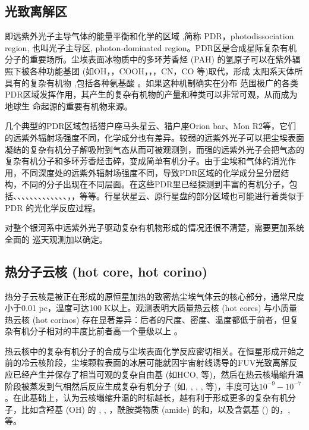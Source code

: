 \documentclass{report}
\begin{document}
\subsection{光致离解区} 即远紫外光子主导气体的能量平衡和化学的区域 \citep{Tielens2005} ,简称 PDR，photodissociation region, 也叫光子主导区, photon-dominated region。PDR区是合成星际复杂有机分子的重要场所。尘埃表⾯冰物质中的多环芳香烃 (PAH) 的氢原子可以在紫外辐照下被各种功能基团 (如OH，，COOH，，，CN，CO 等)取代，形成 太阳系天体所具有的复杂有机物 \citep{Bernstein2002},包括各种氨基酸 \citep{Bernstein2002a}。如果这种机制确实在分布 范围极广的各类PDR区域发挥作用，其产生的复杂有机物的产量和种类可以非常可观，从⽽成为地球生 命起源的重要有机物来源。

几个典型的PDR区域包括猎户座马头星云、猎户座Orion bar、Mon R2等，它们的远紫外辐射场强度不同，化学成分也有差异。较弱的远紫外光子可以把尘埃表面凝结的复杂有机分子解吸附到气态从而可被观测到，而强的远紫外光子会把气态的复杂有机分子和多环芳香烃击碎，变成简单有机分子。由于尘埃和气体的消光作用，不同深度处的远紫外辐射场强度不同，导致PDR区域的化学成分呈分层结构，不同的分子出现在不同层面。在这些PDR里已经探测到丰富的有机分子，包括、、、、、、、、、、、、、，，等等。行星状星云、原行星盘的部分区域也可能进行着类似于 PDR 的光化学反应过程。

对整个银河系中远紫外光子驱动复杂有机物形成的情况还很不清楚，需要更加系统全面的 巡天观测加以确定。

\subsection{热分子云核 (hot core, hot corino)}
热分子云核是被正在形成的原恒星加热的致密热尘埃气体云的核心部分，通常尺度小于0.01{} pc，温度可达100 K以上。观测表明大质量热云核 (hot cores) 与小质量热云核 (hot corinos) 存在显著差异：后者的尺度、密度、温度都低于前者，但复杂有机分子相对的丰度比前者高一个量级以上 \citep{Caselli2012}。

热云核中的复杂有机分子的合成与尘埃表面化学反应密切相关。在恒星形成开始之前的冷云核阶段，尘埃颗粒表面的冰层可能就因宇宙射线诱导的FUV光致离解反应已经产生并保存了相当可观的复杂自由基 (如HCO, 等)，然后在热云核塌缩升温阶段被蒸发到气相然后反应生成复杂有机分子 (如, , , , 等)，丰度可达$10^{-9}-10^{-7}$。在此基础上，\citet{Garrod2008}认为云核塌缩升温的时标越长，越有利于形成更多的复杂有机分子，比如含羟基 (OH) 的 , , ，酰胺类物质 (amide) 的和，以及含氨基 () 的，, 等。
\end{document}

